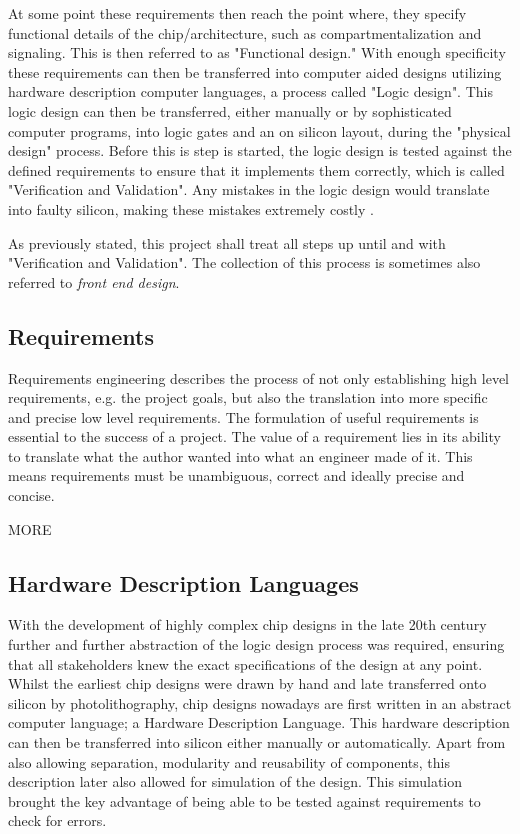 At some point these requirements then reach the point where, they specify functional details of the chip/architecture, such as compartmentalization and signaling. This is then referred to as "Functional design." With enough specificity these requirements can then be transferred into computer aided designs utilizing hardware description computer languages, a process called "Logic design". This logic design can then be transferred, either manually or by sophisticated computer programs, into logic gates and an on silicon layout, during the "physical design"  process. Before this is step is started, the logic design is tested against the defined requirements to ensure that it implements them correctly, which is called "Verification and Validation". Any mistakes in the logic design would translate into faulty silicon, making these mistakes extremely costly \cite{chipdesignflow1} \cite{chipdesignflow2}.

As previously stated, this project shall treat all steps up until and with "Verification and Validation". The collection of this process is sometimes also referred to \textit{front end design}.

\subsection{Requirements}
Requirements engineering describes the process of not only establishing high level requirements, e.g. the project goals, but also the translation into more specific and precise low level requirements. The formulation of useful requirements is essential to the success of a project. The value of a requirement lies in its ability to translate what the author wanted into what an engineer made of it. This means requirements must be unambiguous, correct and ideally precise and concise.

MORE

\subsection{Hardware Description Languages}
With the development of highly complex chip designs in the late 20th century further and further abstraction of the logic design process was required, ensuring that all stakeholders knew the exact specifications of the design at any point. \cite{1214355} Whilst the earliest chip designs were drawn by hand and late transferred onto silicon by photolithography, chip designs nowadays are first written in an abstract computer language; a Hardware Description Language. This hardware description can then be transferred into silicon either manually or automatically.  Apart from also allowing separation, modularity and reusability of components, this description later also allowed for simulation of the design. This simulation brought the key advantage of being able to be tested against requirements to check for errors.

